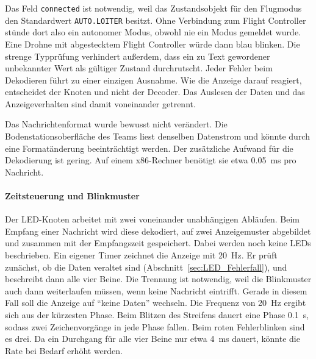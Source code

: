             Das Feld \texttt{connected} ist notwendig, weil das Zustandsobjekt für den Flugmodus den Standardwert \texttt{AUTO.LOITER} besitzt. Ohne Verbindung zum Flight Controller stünde dort also ein autonomer Modus, obwohl nie ein Modus gemeldet wurde. Eine Drohne mit abgestecktem Flight Controller würde dann blau blinken. Die strenge Typprüfung verhindert außerdem, dass ein zu Text gewordener unbekannter Wert als gültiger Zustand durchrutscht. Jeder Fehler beim Dekodieren führt zu einer einzigen Ausnahme. Wie die Anzeige darauf reagiert, entscheidet der Knoten und nicht der Decoder. Das Auslesen der Daten und das Anzeigeverhalten sind damit voneinander getrennt.

            Das Nachrichtenformat wurde bewusst nicht verändert. Die Bodenstationsoberfläche des Teams liest denselben Datenstrom und könnte durch eine Formatänderung beeinträchtigt werden. Der zusätzliche Aufwand für die Dekodierung ist gering. Auf einem x86-Rechner benötigt sie etwa \SI{0,05}{\milli\second} pro Nachricht.

            \paragraph{Zeitsteuerung und Blinkmuster}
            Der LED-Knoten arbeitet mit zwei voneinander unabhängigen Abläufen. Beim Empfang einer Nachricht wird diese dekodiert, auf zwei Anzeigemuster abgebildet und zusammen mit der Empfangszeit gespeichert. Dabei werden noch keine LEDs beschrieben. Ein eigener Timer zeichnet die Anzeige mit \SI{20}{\hertz}. Er prüft zunächst, ob die Daten veraltet sind (Abschnitt~\ref{sec:LED_Fehlerfall}), und beschreibt dann alle vier Beine. Die Trennung ist notwendig, weil die Blinkmuster auch dann weiterlaufen müssen, wenn keine Nachricht eintrifft. Gerade in diesem Fall soll die Anzeige auf \enquote{keine Daten} wechseln. Die Frequenz von \SI{20}{\hertz} ergibt sich aus der kürzesten Phase. Beim Blitzen des Streifens dauert eine Phase \SI{0,1}{\second}, sodass zwei Zeichenvorgänge in jede Phase fallen. Beim roten Fehlerblinken sind es drei. Da ein Durchgang für alle vier Beine nur etwa \SI{4}{\milli\second} dauert, könnte die Rate bei Bedarf erhöht werden.

